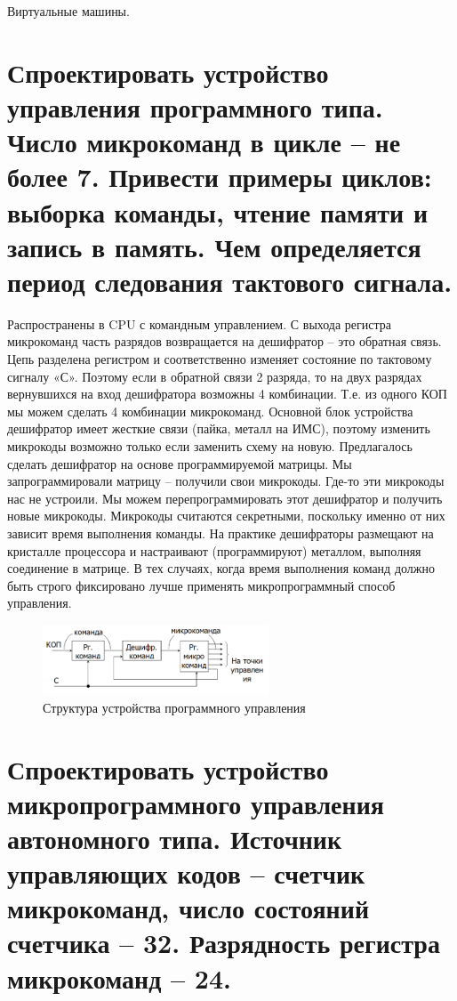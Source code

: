 \documentclass[unicode, 12pt, a4paper, oneside]{article}
\begin{document}
\begin{enumerate}
Виртуальные машины.


\end{enumerate} 
\section{Спроектировать устройство управления программного типа. Число микрокоманд в цикле – не более 7. Привести примеры циклов: выборка команды, чтение памяти и запись в память. Чем определяется период следования тактового сигнала.}

Распространены в CPU с командным управлением. С выхода регистра микрокоманд часть разрядов возвращается на дешифратор – это обратная связь. Цепь разделена регистром и соответственно изменяет состояние по тактовому сигналу «С». Поэтому если в обратной связи 2 разряда, то на двух разрядах вернувшихся на вход дешифратора возможны 4 комбинации. Т.е. из одного КОП мы можем сделать 4 комбинации микрокоманд. Основной блок устройства дешифратор имеет жесткие связи (пайка, металл на ИМС), поэтому изменить микрокоды возможно только если заменить схему на новую. Предлагалось сделать дешифратор на основе программируемой матрицы. Мы запрограммировали матрицу – получили свои микрокоды. Где-то эти микрокоды нас не устроили. Мы можем перепрограммировать этот дешифратор и получить новые микрокоды. Микрокоды считаются секретными, поскольку именно от них зависит время выполнения команды. На практике дешифраторы размещают на кристалле процессора и настраивают (программируют) металлом, выполняя соединение в матрице. В тех случаях, когда время выполнения команд должно быть строго фиксировано лучше применять микропрограммный способ управления.
 
\begin{center}
\begin{figure}[H]
\centering
\includegraphics[width=0.6\textwidth]{109_struct.png}
\caption{Структура устройства программного управления}
\end{figure}  
\end{center}

\section{Спроектировать устройство микропрограммного управления автономного типа. Источник управляющих кодов – счетчик микрокоманд, число состояний счетчика – 32. Разрядность регистра микрокоманд – 24.}
\end{document}
